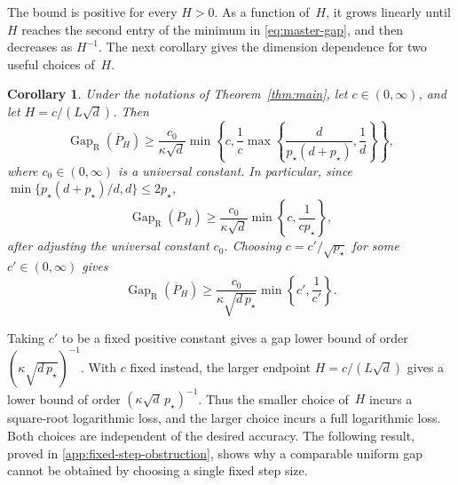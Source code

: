 \documentclass[11pt]{article}
\newtheorem{corollary}[corollary]{Corollary}
\newcommand{\Gap}{\operatorname{Gap}_{\mathrm{R}}}
\newcommand{\1}{\mathbf 1}
\begin{document}
	The bound is positive for every $H>0$. As a function of~$H$, it grows
	linearly until $H$ reaches the second entry of the minimum in
	\eqref{eq:master-gap}, and then decreases as $H^{-1}$. The next corollary
	gives the dimension dependence for two useful choices of~$H$.
	
	\begin{corollary}\label{cor:sqrt-d-endpoint}
		Under the notations of Theorem~\ref{thm:main},
		let \(c \in (0,\infty)\), and let \(H=c/(L\sqrt d)\).
		Then
		\[
		\Gap(\overline P_H) \geq \frac{c_0}{\kappa\sqrt{d}}
		\min \left\{ c, \frac1c
		\max \left\{ \frac{d}{p_\star(d+p_\star)}, \frac{1}{d} \right\} \right\},
		\]
		where $c_0 \in (0,\infty)$ is a universal constant.
		In particular, since $\min\{p_\star(d+p_\star)/d,d\}\leq2p_\star$,
		\[
		\Gap(\overline P_H) \geq \frac{c_0}{\kappa\sqrt{d}}
		\min\left\{ c, \frac1{cp_\star} \right\},
		\]
		after adjusting the universal constant $c_0$.
		Choosing \(c=c'/\sqrt{p_{\star}}\) for some $c' \in (0,\infty)$ gives
		\[
		\Gap(\overline P_H)
		\geq
		\frac{c_0}{\kappa\sqrt{d\,p_\star}}
		\min\left\{c',\frac1{c'}\right\}.
		\]
	\end{corollary}
	
	
	Taking $c'$ to be a fixed positive constant gives a gap lower bound
	of order $(\kappa\sqrt{d\,p_\star})^{-1}$.
	With $c$ fixed instead, the larger endpoint $H=c/(L\sqrt d)$ gives a
	lower bound of order $(\kappa\sqrt d\,p_\star)^{-1}$.
	Thus the smaller choice of~$H$ incurs a square-root logarithmic loss,
	and the larger choice incurs a full logarithmic loss.
	Both choices are independent of the desired accuracy.
	The following result, proved in \cref{app:fixed-step-obstruction},
	shows why a comparable uniform gap cannot be obtained by choosing a
	single fixed step size.
	
\end{document}
